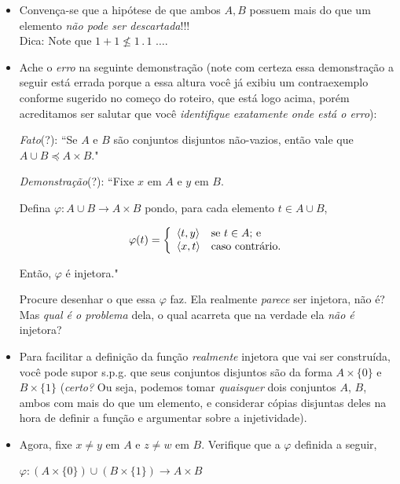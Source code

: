 \documentclass{hipatia}
\newcommand{\bc}{\begin{center}}
\newcommand{\ec}{\end{center}}
\newcommand{\nmeni}{\nleqslant}
\newcommand{\pe}{\langle}
\newcommand{\pd}{\rangle}
\newcommand{\dominado}{\preccurlyeq}
\begin{document}
\begin{itemize}

\item Convença-se que a hipótese de que ambos
$A,B$ possuem mais do que um elemento {\it não
pode ser descartada}!!! \\Dica: Note que $1 +
1 \nmeni 1\,.\,1\,\,\ldots$.

\item Ache o {\it erro} na seguinte demonstração
(note com certeza essa demonstração  a seguir
está errada porque a essa altura você já
exibiu um contraexemplo conforme sugerido no
co\-me\-ço do roteiro, que está logo  acima,
porém acreditamos ser salutar que você {\it
identifique exatamente onde está o erro}):

{\it Fato}(?): ``Se $A$ e $B$ são conjuntos
disjuntos não-vazios, então vale que $A \cup B
\dominado A \times B$."\,

{\it Demonstração}(?): ``Fixe $x$ em $A$ e $y$
em $B$.

Defina $\varphi\colon A\cup B\to A\times B$
pondo, para cada elemento $t\in A\cup B$, 

\begin{align*} \varphi(t) = \left\{
\begin{array}{ll} \pe t,y \pd  & \hbox{se
$t \in A$; e} \\ \pe x,t \pd & \hbox{caso
contrário.} \end{array} \right.
\end{align*}

Então, $\varphi$ é injetora."\,

Procure desenhar o que essa $\varphi$ faz. Ela
realmente {\it parece} ser injetora, não é?
Mas {\it qual é o problema} dela, o qual
acarreta que na verdade ela {\it não é}
injetora?


\item Para facilitar a definição da função {\it
realmente} injetora que vai ser construída,
você pode supor s.p.g. que seus conjuntos
disjuntos são da forma $A \times \{0\}$ e $B
\times \{1\}$ ({\it certo?} Ou seja, podemos
tomar {\it quaisquer} dois conjuntos $A$, $B$,
ambos com mais do que um elemento, e
considerar cópias disjuntas deles na hora de
definir a função e argumentar sobre a
injetividade).

\item Agora, fixe $x \neq y$ em $A$ e $z \neq w$
em $B$. Verifique que a $\varphi$ definida a
seguir, 

\bc $\varphi\colon (A \times \{0\}) \cup (B
\times \{1\}) \to A \times B$  \ec


\end{itemize}
\end{document}
